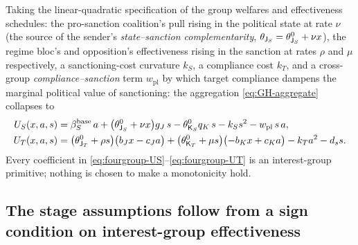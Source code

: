 Taking the linear-quadratic specification of the group welfares and
effectiveness schedules: the pro-sanction coalition's pull rising
in the political state at rate $\nu$ (the source of the sender's
\emph{state--sanction complementarity},
$\theta_{\mathsf{J}_S}=\theta^0_{\mathsf{J}_S}+\nu x$), the regime bloc's and
opposition's effectiveness rising in the sanction at rates $\rho$ and
$\mu$ respectively, a sanctioning-cost curvature $k_S$, a compliance
cost $k_T$, and a cross-group \emph{compliance--sanction} term $w_{\mathrm{pl}}$
by which target compliance dampens the marginal political value of
sanctioning: the aggregation \eqref{eq:GH-aggregate} collapses to
\begin{align}
U_S(x,a,s)&=\beta^{\mathrm{base}}_S\,a
+\bigl(\theta^0_{\mathsf{J}_S}+\nu x\bigr)g_J\,s
-\theta^0_{\mathsf{K}_S}q_K\,s
-k_S s^2
-w_{\mathrm{pl}}\,s\,a,
\label{eq:fourgroup-US}\\
U_T(x,a,s)&=\bigl(\theta^0_{\mathsf{J}_T}+\rho s\bigr)\bigl(b_J x-c_J a\bigr)
+\bigl(\theta^0_{\mathsf{K}_T}+\mu s\bigr)\bigl(-b_K x+c_K a\bigr)
-k_T a^2-d_s s .
\label{eq:fourgroup-UT}
\end{align}
Every coefficient in \eqref{eq:fourgroup-US}--\eqref{eq:fourgroup-UT}
is an interest-group primitive; nothing is chosen to make a
monotonicity hold.

\subsection{The stage assumptions follow from a sign condition on interest-group effectiveness}
\label{sec:fourgroup:derived}

